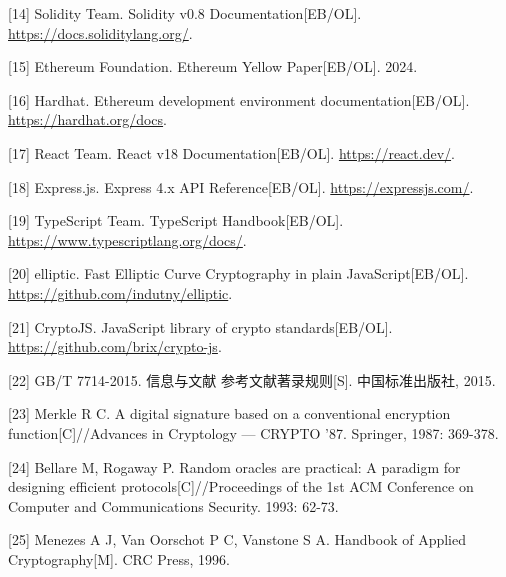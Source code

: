 \documentclass[UTF8,a4paper,zihao=-4,openany]{ctexrep}
\begin{document}
[14] Solidity Team. Solidity v0.8 Documentation[EB/OL]. \url{https://docs.soliditylang.org/}.

[15] Ethereum Foundation. Ethereum Yellow Paper[EB/OL]. 2024.

[16] Hardhat. Ethereum development environment documentation[EB/OL]. \url{https://hardhat.org/docs}.

[17] React Team. React v18 Documentation[EB/OL]. \url{https://react.dev/}.

[18] Express.js. Express 4.x API Reference[EB/OL]. \url{https://expressjs.com/}.

[19] TypeScript Team. TypeScript Handbook[EB/OL]. \url{https://www.typescriptlang.org/docs/}.

[20] elliptic. Fast Elliptic Curve Cryptography in plain JavaScript[EB/OL]. \url{https://github.com/indutny/elliptic}.

[21] CryptoJS. JavaScript library of crypto standards[EB/OL]. \url{https://github.com/brix/crypto-js}.

[22] GB/T 7714-2015. 信息与文献 参考文献著录规则[S]. 中国标准出版社, 2015.

[23] Merkle R C. A digital signature based on a conventional encryption function[C]//Advances in Cryptology — CRYPTO '87. Springer, 1987: 369-378.

[24] Bellare M, Rogaway P. Random oracles are practical: A paradigm for designing efficient protocols[C]//Proceedings of the 1st ACM Conference on Computer and Communications Security. 1993: 62-73.

[25] Menezes A J, Van Oorschot P C, Vanstone S A. Handbook of Applied Cryptography[M]. CRC Press, 1996.
\end{document}
